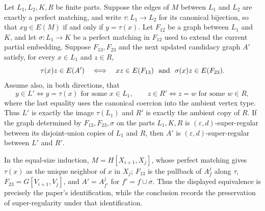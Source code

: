 \begin{lemma}
Let $L_1,L_2,K,R$ be finite parts. Suppose the edges of $M$ between
$L_1$ and $L_2$ are exactly a perfect matching, and write
$\tau:L_1\to L_2$ for its canonical bijection, so that
$xy\in E(M)$ if and only if $y=\tau(x)$. Let $F_{12}$ be a graph between
$L_1$ and $K$, and let $\sigma:L_1\to K$ be a perfect matching in $F_{12}$
used to extend the current partial embedding. Suppose $F_{13},F_{23}$ and
the next updated candidacy graph $A'$ satisfy, for every $x\in L_1$ and
$z\in R$,
\[
 \tau(x)z\in E(A')
 \quad\Longleftrightarrow\quad
 xz\in E(F_{13})\ \hbox{ and }\ \sigma(x)z\in E(F_{23}).
\]
Assume also, in both directions, that
\[
y\in L'\Longleftrightarrow y=\tau(x)\text{ for some }x\in L_1,
\qquad
z\in R'\Longleftrightarrow z=w\text{ for some }w\in R,
\]
where the last equality uses the canonical coercion into the ambient vertex
type. Thus $L'$ is exactly the image $\tau(L_1)$ and $R'$ is exactly the
ambient copy of $R$. If the graph  determined
by $F_{13},F_{23},\sigma$ on the parts $L_1,K,R$ is
$(\varepsilon,d)$-super-regular between its disjoint-union copies of $L_1$
and $R$, then $A'$ is $(\varepsilon,d)$-super-regular between $L'$ and $R'$.

In the equal-size induction, $M=H[X_{i+1},X_j]$, whose perfect matching gives $\tau(x)$ as the unique neighbor of $x$ in $X_j$; $F_{13}$ is the pullback of $A_f^j$ along $\tau$, $F_{23}=G[V_{i+1},V_j]$, and $A'=A_{f'}^j$ for $f'=f\cup\sigma$.  Thus the displayed equivalence is precisely the paper's identification, while the conclusion records the preservation of super-regularity under that identification.
\end{lemma}
